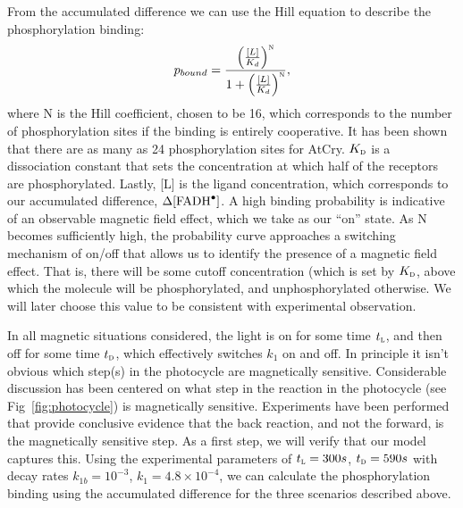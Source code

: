 \documentclass[twoside,twocolumn,9pt]{article}
\begin{document}
From the accumulated difference we can use the Hill equation to describe the phosphorylation binding: \cite{Phillips2009}
\begin{equation}
	p_{bound} = \frac{\left( \frac{[L]}{K_{d}} \right)^{\textsc{n}}}{1 + \left( \frac{[L]}{K_{d}} \right)^{\textsc{n}}},
	\label{eq:phosph}
\end{equation}
where N is the Hill coefficient, chosen to be 16, which corresponds to the number of phosphorylation sites if the binding is entirely cooperative. \cite{Phillips2009} It has been shown \cite{Liu2017} that there are as many as 24 phosphorylation sites for AtCry. $K_{\textsc{d}}$ is a dissociation constant that sets the concentration at which half of the receptors are phosphorylated. Lastly, [L] is the ligand concentration, which corresponds to our accumulated difference, $\Delta [\ce{FADH^{.}}]$. A high binding probability is indicative of an observable magnetic field effect, which we take as our ``on'' state. 
As N becomes sufficiently high, the probability curve approaches a switching mechanism of on/off that allows us to identify the presence of a magnetic field effect. That is, there will be some cutoff concentration (which is set by $K_{\textsc{d}}$, above which the molecule will be phosphorylated, and unphosphorylated otherwise. We will later choose this value to be consistent with experimental observation.

In all magnetic situations considered, the light is on for some time $t_{\textsc{l}}$, and then off for some time $t_{\textsc{d}}$, which effectively switches $k_{1}$ on and off. In principle it isn't obvious which step(s) in the photocycle are magnetically sensitive. Considerable discussion has been centered on what step in the reaction in the photocycle (see Fig~\ref{fig:photocycle}) is magnetically sensitive. Experiments have been performed that provide conclusive evidence that the back reaction, and not the forward, is the magnetically sensitive step. As a first step, we will verify that our model captures this. Using the experimental parameters \cite{Pooam2019} of $t_{\textsc{l}} = 300s$, $t_{\textsc{d}} = 590s$ with decay rates $k_{1b} = 10^{-3}$, $k_{1} = 4.8 \times 10^{-4}$, \cite{Procopio2016} we can calculate the phosphorylation binding using the accumulated difference for the three scenarios described above.
\end{document}
